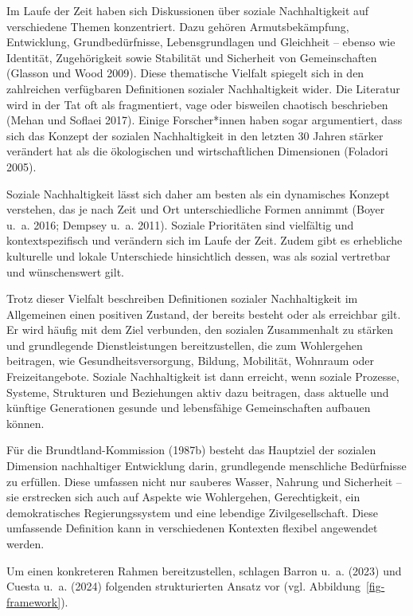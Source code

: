 \documentclass[
  nswissgerman,
  a4paper,
  openany]{book}
\begin{document}
Im Laufe der Zeit haben sich Diskussionen über soziale Nachhaltigkeit
auf verschiedene Themen konzentriert. Dazu gehören Armutsbekämpfung,
Entwicklung, Grundbedürfnisse, Lebensgrundlagen und Gleichheit -- ebenso
wie Identität, Zugehörigkeit sowie Stabilität und Sicherheit von
Gemeinschaften (Glasson und Wood 2009). Diese thematische Vielfalt
spiegelt sich in den zahlreichen verfügbaren Definitionen sozialer
Nachhaltigkeit wider. Die Literatur wird in der Tat oft als
fragmentiert, vage oder bisweilen chaotisch beschrieben (Mehan und
Soflaei 2017). Einige Forscher*innen haben sogar argumentiert, dass sich
das Konzept der sozialen Nachhaltigkeit in den letzten 30 Jahren stärker
verändert hat als die ökologischen und wirtschaftlichen Dimensionen
(Foladori 2005).

Soziale Nachhaltigkeit lässt sich daher am besten als ein dynamisches
Konzept verstehen, das je nach Zeit und Ort unterschiedliche Formen
annimmt (Boyer u.~a. 2016; Dempsey u.~a. 2011). Soziale Prioritäten sind
vielfältig und kontextspezifisch und verändern sich im Laufe der Zeit.
Zudem gibt es erhebliche kulturelle und lokale Unterschiede hinsichtlich
dessen, was als sozial vertretbar und wünschenswert gilt.

Trotz dieser Vielfalt beschreiben Definitionen sozialer Nachhaltigkeit
im Allgemeinen einen positiven Zustand, der bereits besteht oder als
erreichbar gilt. Er wird häufig mit dem Ziel verbunden, den sozialen
Zusammenhalt zu stärken und grundlegende Dienstleistungen
bereitzustellen, die zum Wohlergehen beitragen, wie
Gesundheitsversorgung, Bildung, Mobilität, Wohnraum oder
Freizeitangebote. Soziale Nachhaltigkeit ist dann erreicht, wenn soziale
Prozesse, Systeme, Strukturen und Beziehungen aktiv dazu beitragen, dass
aktuelle und künftige Generationen gesunde und lebensfähige
Gemeinschaften aufbauen können.

Für die Brundtland-Kommission (1987b) besteht das Hauptziel der sozialen
Dimension nachhaltiger Entwicklung darin, grundlegende menschliche
Bedürfnisse zu erfüllen. Diese umfassen nicht nur sauberes Wasser,
Nahrung und Sicherheit -- sie erstrecken sich auch auf Aspekte wie
Wohlergehen, Gerechtigkeit, ein demokratisches Regierungssystem und eine
lebendige Zivilgesellschaft. Diese umfassende Definition kann in
verschiedenen Kontexten flexibel angewendet werden.

Um einen konkreteren Rahmen bereitzustellen, schlagen Barron u.~a.
(2023) und Cuesta u.~a. (2024) folgenden strukturierten Ansatz vor (vgl.
Abbildung~\ref{fig-framework}).
\end{document}

